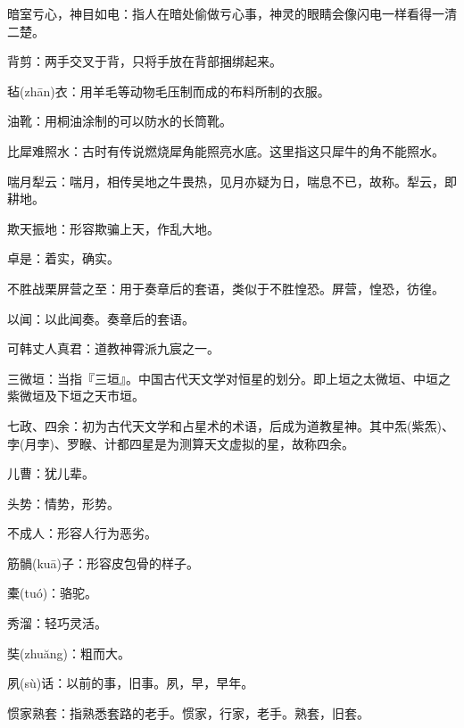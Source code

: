 \startbuffer[1583]
暗室亏心，神目如电：指人在暗处偷做亏心事，神灵的眼睛会像闪电一样看得一清二楚。
\stopbuffer


\startbuffer[1584]
背剪：两手交叉于背，只将手放在背部捆绑起来。
\stopbuffer


\startbuffer[1585]
毡(zhān)衣：用羊毛等动物毛压制而成的布料所制的衣服。
\stopbuffer


\startbuffer[1586]
油靴：用桐油涂制的可以防水的长筒靴。
\stopbuffer


\startbuffer[1587]
比犀难照水：古时有传说燃烧犀角能照亮水底。这里指这只犀牛的角不能照水。
\stopbuffer


\startbuffer[1588]
喘月犁云：喘月，相传吴地之牛畏热，见月亦疑为日，喘息不已，故称。犁云，即耕地。
\stopbuffer


\startbuffer[1589]
欺天振地：形容欺骗上天，作乱大地。
\stopbuffer


\startbuffer[1590]
卓是：着实，确实。
\stopbuffer


\startbuffer[1591]
不胜战栗屏营之至：用于奏章后的套语，类似于不胜惶恐。屏营，惶恐，彷徨。
\stopbuffer


\startbuffer[1592]
以闻：以此闻奏。奏章后的套语。
\stopbuffer


\startbuffer[1593]
可韩丈人真君：道教神霄派九宸之一。
\stopbuffer


\startbuffer[1594]
三微垣：当指『三垣』。中国古代天文学对恒星的划分。即上垣之太微垣、中垣之紫微垣及下垣之天市垣。
\stopbuffer


\startbuffer[1595]
七政、四余：初为古代天文学和占星术的术语，后成为道教星神。其中炁(紫炁)、孛(月孛)、罗睺、计都四星是为测算天文虚拟的星，故称四余。
\stopbuffer


\startbuffer[1596]
儿曹：犹儿辈。
\stopbuffer


\startbuffer[1597]
头势：情势，形势。
\stopbuffer


\startbuffer[1598]
不成人：形容人行为恶劣。
\stopbuffer


\startbuffer[1599]
筋䯞(kuā)子：形容皮包骨的样子。
\stopbuffer


\startbuffer[1600]
橐(tuó)：骆驼。
\stopbuffer


\startbuffer[1601]
秀溜：轻巧灵活。
\stopbuffer


\startbuffer[1602]
奘(zhuăng)：粗而大。
\stopbuffer


\startbuffer[1603]
夙(sù)话：以前的事，旧事。夙，早，早年。
\stopbuffer


\startbuffer[1604]
惯家熟套：指熟悉套路的老手。惯家，行家，老手。熟套，旧套。
\stopbuffer


